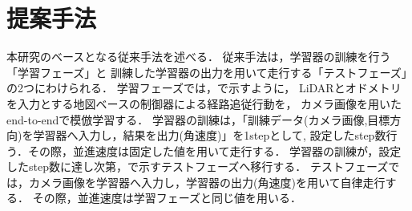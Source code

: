 \documentclass[10pt]{jarticle}
\begin{document}
    \section{提案手法}%
           
    本研究のベースとなる従来手法を述べる．
    従来手法は，学習器の訓練を行う「学習フェーズ」と
    訓練した学習器の出力を用いて走行する「テストフェーズ」の2つにわけられる．
    学習フェーズでは，で示すように，
    LiDARとオドメトリを入力とする地図ベースの制御器による経路追従行動を，
    カメラ画像を用いたend-to-endで模倣学習する．
    学習器の訓練は，「訓練データ(カメラ画像,目標方向)を学習器へ入力し，結果を出力(角速度)」を1stepとして,
    設定したstep数行う．その際，並進速度は固定した値を用いて走行する．
    学習器の訓練が，設定したstep数に達し次第，で示すテストフェーズへ移行する．
    テストフェーズでは，カメラ画像を学習器へ入力し，学習器の出力(角速度)を用いて自律走行する．
    その際，並進速度は学習フェーズと同じ値を用いる．
    
\end{document}
